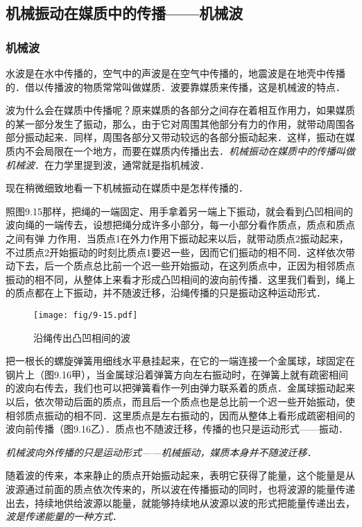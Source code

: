 \subsection{机械振动在媒质中的传播——机械波}
\subsubsection{机械波} 

水波是在水中传播的，空气中的声波是在空气中传播的，地震波是在地壳中传播的．借以传播波的物质常常叫做媒质．波要靠媒质来传播，这是机械波的特点．


波为什么会在媒质中传播呢？原来媒质的各部分之间存在着相互作用力，如果媒质的某一部分发生了振动，那么，由于它对周围其他部分有力的作用，就带动周围各部分振动起来．同样，周围各部分又带动较远的各部分振动起来．这样，振动在媒质内不会局限在一个地方，而要在媒质内传播出去．\textit{机械振动在媒质中的传播叫做机械波}．在力学里提到波，通常就是指机械波．

现在稍微细致地看一下机械振动在媒质中是怎样传播的．

照图9.15那样，把绳的一端固定、用手拿着另一端上下振动，就会看到凸凹相间的波向绳的一端传去，设想把绳分成许多小部分，每一小部分看作质点，质点和质点之间有弹
力作用．当质点1在外力作用下振动起来以后，就带动质点2振动起来，不过质点2开始振动的时刻比质点1要迟一些，因而它们振动的相不同．这样依次带动下去，后一个质点总比前一个迟一些开始振动，在这列质点中，正因为相邻质点振动的相不同，从整体上来看才形成凸凹相间的波向前传播．这里我们看到，绳上的质点都在上下振动，并不随波迁移，沿绳传播的只是振动这种运动形式．

\begin{figure}[htp]\centering
\texttt{[image: fig/9-15.pdf]}
\caption{沿绳传出凸凹相间的波}
\end{figure}

把一根长的螺旋弹簧用细线水平悬挂起来，在它的一端连接一个金属球，球固定在钢片上（图9.16甲），当金属球沿着弹簧方向左右振动时，在弹簧上就有疏密相间的波向右传去，我们也可以把弹簧看作一列由弹力联系着的质点．金属球振动起来以后，依次带动后面的质点，而且后一个质点也是总比前一个迟一些开始振动，使相邻质点振动的相不同．这里质点是左右振动的，因而从整体上看形成疏密相间的波向前传播（图9.16乙）．质点也不随波迁移，传播的也只是运动形式——振动．

\textit{机械波向外传播的只是运动形式——机械振动，媒质本身并不随波迁移．}

随着波的传来，本来静止的质点开始振动起来，表明它获得了能量，这个能量是从波源通过前面的质点依次传来的，所以波在传播振动的同时，也将波源的能量传递出去，持续地供给波源以能量，就能够持续地从波源以波的形式把能量传递出去，\textit{波是传递能量的一种方式}．

